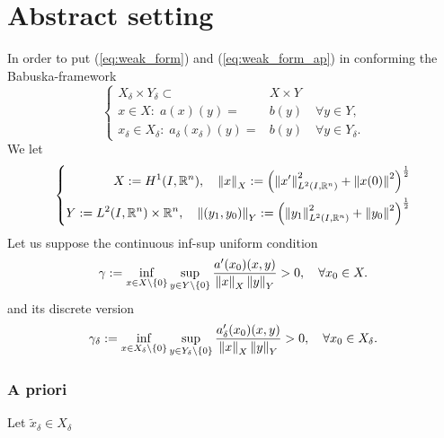 \documentclass[english,12pt,a4paper]{article}
\begin{document}
%
\section{Abstract setting}\label{sec:}
%
In order to put (\ref{eq:weak_form}) and (\ref{eq:weak_form_ap}) in conforming the Babuska-framework   \cite{XuZikatanov03}
%
\begin{equation}\label{eq:}
%
\left\{
\begin{aligned}
X_{\delta}\times Y_{\delta} \subset& X\times Y\\
x\in X:\; a(x)(y) =& b(y)\quad\forall y\in Y,\\ 
x_{\delta}\in X_{\delta}:\; a_{\delta}(x_{\delta})(y) =& b(y)\quad\forall y\in Y_{\delta}.
\end{aligned}
\right.
%
\end{equation}
%
We  let
%
\begin{equation}\label{eq:}
\left\{
\begin{aligned}
X := H^1(I,\mathbb R^n),\quad \left\|x\right\|_X := \left(\left\|x'\right\|_{L^2(I,\mathbb R^n)}^2 + \left\|x(0)\right\|^2\right)^{\frac12}\\
Y := L^2(I,\mathbb R^n) \times \mathbb R^n,\quad \left\|(y_1,y_0)\right\|_Y := \left( \left\|y_1\right\|_{L^2(I,\mathbb R^n)}^2 + \left\|y_0\right\|^2 \right)^{\frac12}
\end{aligned}
\right.
\end{equation}
%
%
Let us suppose the continuous inf-sup uniform condition
%
\begin{equation}\label{eq:abstract_infsup}
\gamma := \inf_{x\in X\setminus\left\{0\right\}}\sup_{y\in Y\setminus\left\{0\right\}} \frac{a'(x_0)(x,y)}{\left\|x\right\|_X\left\|y\right\|_Y}  > 0,\quad \forall x_0\in X.
\end{equation}
%
and its discrete version
%
\begin{equation}\label{eq:abstract_infsup_delta}
\gamma_{\delta} := \inf_{x\in X_{\delta}\setminus\left\{0\right\}}\sup_{y\in Y_{\delta}\setminus\left\{0\right\}} \frac{a_{\delta}'(x_0)(x,y)}{\left\|x\right\|_X\left\|y\right\|_Y}  > 0,\quad \forall x_0\in X_{\delta}.
\end{equation}
%
\subsubsection{A priori}
%
Let $\widetilde{x}_{\delta} \in X_{\delta}$
%
%
\end{document}
